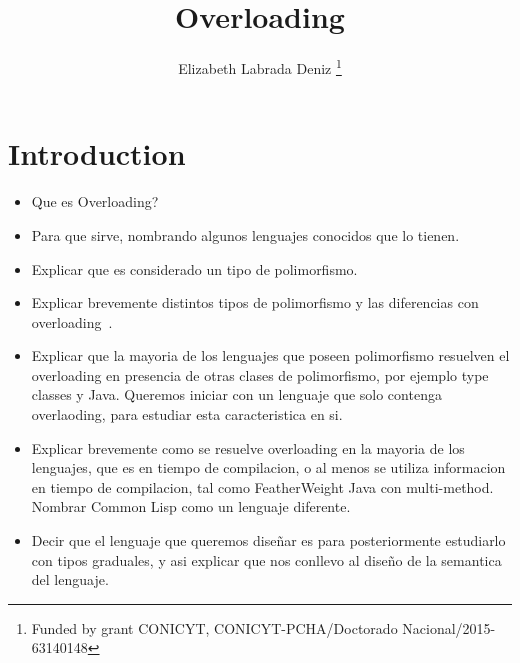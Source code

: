 \documentclass{article}
\title{\bf Overloading}
\author{Elizabeth Labrada Deniz
\thanks{Funded by grant CONICYT, CONICYT-PCHA/Doctorado Nacional/2015-63140148}}
\affil{Computer Science Department (DCC), University of Chile, Chile}
\date{}
\begin{document}
	\maketitle
	\renewcommand{\abstractname}{Abstract}	
	\begin{abstract}
	\end{abstract}	
\section{Introduction}
\begin{itemize}
    \item Que es Overloading?
    \item Para que sirve, nombrando algunos lenguajes conocidos que lo tienen.
    \item Explicar que es considerado un tipo de polimorfismo.
    \item Explicar brevemente distintos tipos de polimorfismo y las diferencias con overloading~\cite{CardelliWegner}.
	\item Explicar que la mayoria de los lenguajes que poseen polimorfismo resuelven el overloading en presencia de otras clases de polimorfismo, por ejemplo type classes y Java. Queremos iniciar con un lenguaje que solo contenga  overlaoding, para estudiar esta caracteristica en si.\cite{Nipkow:1993:TCT:158511.158698, Odersky:1995:SLO:224164.224195, Ribeiro2013, wadlerBlott:popl89}
	\item Explicar brevemente como se resuelve overloading en la mayoria de los lenguajes, que es en tiempo de compilacion, o al menos se utiliza informacion en tiempo de compilacion, tal como FeatherWeight Java con multi-method. Nombrar Common Lisp como un lenguaje diferente.
	\item Decir que el lenguaje que queremos dise\~nar es para posteriormente estudiarlo con tipos graduales, y asi explicar que nos conllevo al diseño de la semantica del lenguaje.

\end{itemize}
\end{document}

